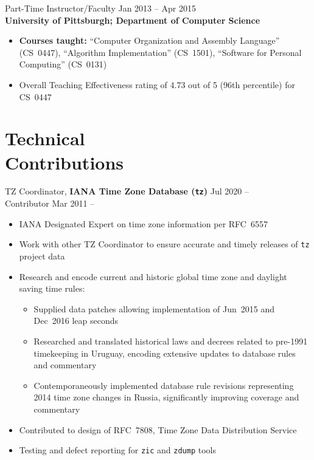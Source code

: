 \documentclass[11pt]{article}
\newcommand{\textdb}[1]{\fontseries{db}\selectfont#1\normalfont}
\newcommand{\present}{\phantom{Xxx 20XX}}
\begin{document}
\textdb{
Part-Time Instructor/Faculty
	\hfill Jan 2013 -- Apr 2015 \\
}
\textbf{University of Pittsburgh; Department of Computer Science}
\begin{itemize}
	\item \textbf{Courses taught:}
		``Computer Organization and Assembly Language'' (CS~0447),
		``Algorithm Implementation'' (CS~1501),
		``Software for Personal Computing'' (CS~0131)
	\item Overall Teaching Effectiveness rating of 4.73 out of 5
		(96th percentile) for CS~0447
\end{itemize}



\section{Technical\\ Contributions}

\textdb{
TZ Coordinator,
\textbf{IANA Time Zone Database (\texttt{tz})}
	\hfill Jul 2020 -- \present \\
}
\textdb{
Contributor
	\hfill Mar 2011 -- \present
}
\begin{itemize}
	\item IANA Designated Expert on time zone information per RFC~6557
	\item Work with other TZ Coordinator to ensure accurate and timely releases
		of \texttt{tz} project data
	\item Research and encode current and historic global time zone and daylight saving time rules:
		\begin{itemize}
			\item Supplied data patches allowing implementation of
				Jun~2015 and Dec~2016 leap seconds
			\item Researched and translated historical laws and decrees
				related to pre-1991 timekeeping in Uruguay,
				encoding extensive updates to database rules and commentary
			\item Contemporaneously implemented database rule revisions
				representing 2014 time zone changes in Russia,
				significantly improving coverage and commentary
		\end{itemize}
	\item Contributed to design of RFC~7808, Time Zone Data Distribution Service
	\item Testing and defect reporting for \texttt{zic} and \texttt{zdump} tools
\end{itemize}
\end{document}
